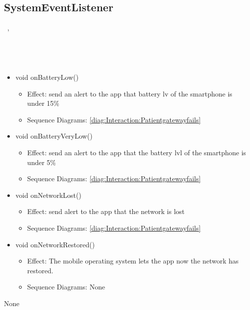   \subsection{SystemEventListener}\label{int:InterfacesSystemEventListener}
    \begin{description}
      \item[Provided by:] \iconcomponent{}~, \iconcomponent{}~
      \item[Required by:] \iconcomponent{}~ 
      \item[Operations:] ~
    \begin{itemize}[noitemsep,nolistsep,leftmargin=-.25cm]
      \item \textsf{void onBatteryLow()}
        \begin{itemize}[noitemsep,nolistsep]
           \item Effect: send an alert to the app that battery lv of the smartphone is under 15\% 
           \item Sequence Diagrams: \cref{diag:Interaction:Patientgatewayfails}
        \end{itemize}
      \item \textsf{void onBatteryVeryLow()}
        \begin{itemize}[noitemsep,nolistsep]
           \item Effect: send an alert to the app that the battery lvl of the smartphone is under 5\% 
           \item Sequence Diagrams: \cref{diag:Interaction:Patientgatewayfails}
        \end{itemize}
      \item \textsf{void onNetworkLost()}
        \begin{itemize}[noitemsep,nolistsep]
           \item Effect: send alert to the app that the network is lost 
           \item Sequence Diagrams: \cref{diag:Interaction:Patientgatewayfails}
        \end{itemize}
      \item \textsf{void onNetworkRestored()}
        \begin{itemize}[noitemsep,nolistsep]
           \item Effect: The mobile operating system lets the app now the network has restored. 
           \item Sequence Diagrams: None
        \end{itemize}
    \end{itemize}
      \item[Diagrams:] None
    \end{description}


